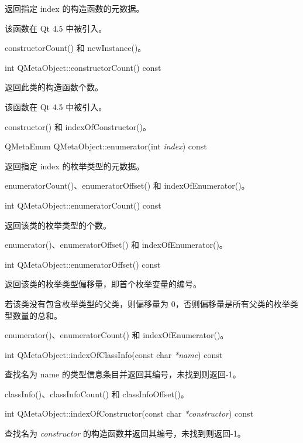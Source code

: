 返回指定 index 的构造函数的元数据。

该函数在 Qt 4.5 中被引入。

\begin{notice}[另请参阅]
constructorCount() 和 newInstance()。
\end{notice}

int QMetaObject::constructorCount() const

返回此类的构造函数个数。

该函数在 Qt 4.5 中被引入。

\begin{notice}[另请参阅]
constructor() 和 indexOfConstructor()。
\end{notice}

QMetaEnum QMetaObject::enumerator(int \emph{index}) const

返回指定 index 的枚举类型的元数据。

\begin{notice}[另请参阅]
enumeratorCount()、enumeratorOffset() 和 indexOfEnumerator()。
\end{notice}

int QMetaObject::enumeratorCount() const

返回该类的枚举类型的个数。

\begin{notice}[另请参阅]
enumerator()、enumeratorOffset() 和 indexOfEnumerator()。
\end{notice}
	
int QMetaObject::enumeratorOffset() const

返回该类的枚举类型偏移量，即首个枚举变量的编号。

若该类没有包含枚举类型的父类，则偏移量为 0，否则偏移量是所有父类的枚举类型数量的总和。

\begin{notice}[另请参阅]
enumerator()、enumeratorCount() 和 indexOfEnumerator()。
\end{notice}

int QMetaObject::indexOfClassInfo(const char \emph{*name}) const

查找名为 name 的类型信息条目并返回其编号，未找到则返回-1。

\begin{notice}[另请参阅]
classInfo()、classInfoCount() 和 classInfoOffset()。
\end{notice}

int QMetaObject::indexOfConstructor(const char \emph{*constructor}) const

查找名为 \emph{constructor} 的构造函数并返回其编号，未找到则返回-1。

